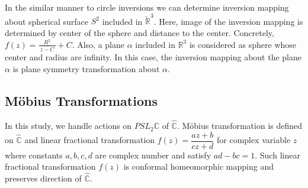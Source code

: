 In the similar manner to circle inversions we can determine inversion
mapping about spherical surface $S^2$ included in $\tilde{\mathbb{R}}^3$.
Here, image of the inversion mapping is determined by center of the sphere and
distance to the center.
Concretely, $f(z) = \frac{R^2}{~\overline{z -C}~} + C$.
Also, a plane $\alpha$ included in $\mathbb{R}^3$ is considered as
sphere whose center and radius are infinity.
In this case, the inversion mapping about the plane $\alpha$ is plane symmetry
transformation about $\alpha$.

\subsection{M\"obius Transformations}


In this study, we handle actions on $PSL_2\mathbb{C}$ of $\hat{\mathbb{C}}$.
M\"obius transformation is defined on $\hat{\mathbb{C}}$ and
linear fractional transformation
$f(z)=\dfrac{az+b}{cz+d}$ for complex variable $z$ where constants
$a, b, c, d$ are complex number and satisfy $ad - bc = 1$.
Such linear fractional transformation $f(z)$ is conformal homeomorphic
mapping and preserves direction of $\hat{\mathbb{C}}$.

